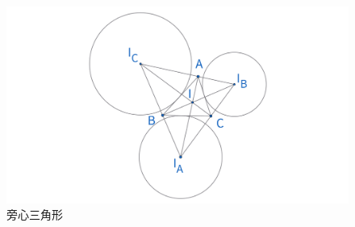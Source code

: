 \begin{figure}[H]
    \centering
    \includegraphics[width=\linewidth]{figures/三角形五心/旁心三角形.png}
    \caption{旁心三角形}
\end{figure}




